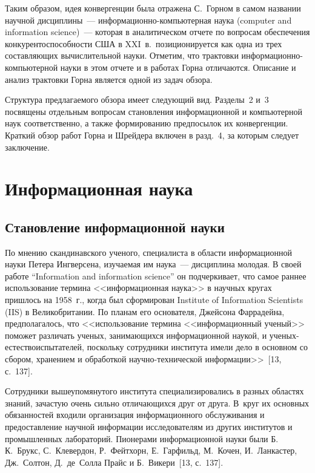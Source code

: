 \begin{multicols}{2}
      Таким образом, идея конвергенции была отражена С.~Горном в самом названии научной
дисциплины~--- информационно-компьютерная наука (computer and information science)~---
которая в аналитическом отчете по вопросам обеспечения конкурентоспособности США в
XXI~в.\ позиционируется как одна из трех составляющих вычислительной науки. Отметим, что
трактовки информационно-компьютерной науки в этом отчете и в работах Горна отличаются.
Описание и анализ трактовки Горна является одной из задач обзора.

      Структура предлагаемого обзора имеет сле\-ду\-ющий вид. Разделы~2 и~3 посвящены
отдельным вопросам становления информационной и компьютерной наук соответственно, а
также формированию предпосылок их конвергенции. Краткий обзор работ Горна и Шрейдера
включен в разд.~4, за которым следует заключение.

\section{Информационная наука}

\subsection{Становление информационной науки} %

      По мнению скандинавского ученого, специалиста в области информационной науки
Петера Ингверсена, изучаемая им наука~--- дисциплина молодая. В своей работе ``Information
and information science'' он подчеркивает, что самое раннее использование термина
<<информационная\linebreak
 наука>> в научных кругах пришлось на 1958~г., когда был сформирован
Institute of Information Scientists (IIS)
в Великобритании. По планам его основателя, Джейсона
Фаррадейна, предполагалось, что <<использование термина <<информационный ученый>>
поможет различать ученых,\linebreak 
занимающихся информационной наукой, и 
уче\-ных-есте\-ст\-во\-ис\-пы\-та\-те\-лей, %
 поскольку сотрудники института имели дело в основном со сбором,
хранением и обработкой научно-технической информации>>~[13, с.~137].

      Сотрудники вышеупомянутого института специализировались в разных областях
знаний, за\-час\-тую очень сильно отличающихся друг от друга. В~круг их основных обязанностей
\mbox{входили} организация информационного обслуживания и предо\-став\-ле\-ние научной информации
исследователям из других институтов и промышленных лабораторий. Пионерами
информационной науки были Б.\,К.~Брукс, С.~Клевердон, Р.~Фейтхорн, Е.~Гарфильд,
М.~Кочен, И.~Ланкастер, Дж.~Солтон, Д.~де~Солла Прайс и 
Б.~Викери~[13, с.~137].


\end{multicols}
